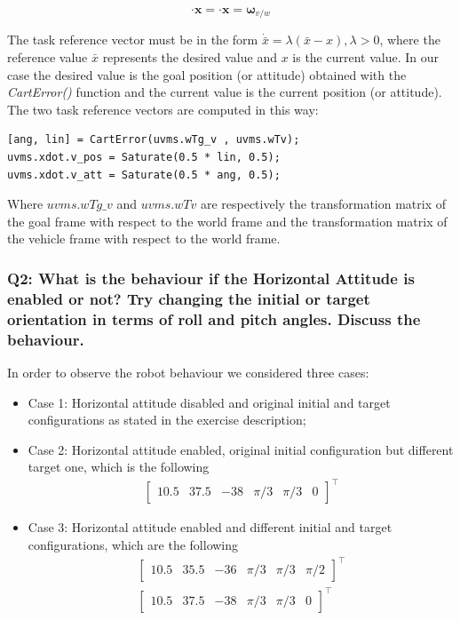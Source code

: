\documentclass{article}
\begin{document}
$$
\cdot{\bm{x}} = \cdot{\bm{x}} = \bm{\omega}_{v/w}
$$

The task reference vector must be in the form $ \dot{\bar{x}} = \lambda(\bar{x} - x), \lambda > 0 $, where the reference value $ \bar{x} $ represents the desired value and $ x $ is the current value. In our case the desired value is the goal position (or attitude) obtained with the \textit{CartError()} function and the current value is the current position (or attitude). \\
The two task reference vectors are computed in this way:
\begin{lstlisting}
[ang, lin] = CartError(uvms.wTg_v , uvms.wTv);
uvms.xdot.v_pos = Saturate(0.5 * lin, 0.5);
uvms.xdot.v_att = Saturate(0.5 * ang, 0.5);
\end{lstlisting}
Where $ uvms.wTg\_v $ and $ uvms.wTv $ are respectively the transformation matrix of the goal frame with respect to the world frame and the transformation matrix of the vehicle frame with respect to the world frame. 


\subsubsection{Q2: What is the behaviour if the Horizontal Attitude is enabled or not? Try changing the initial or target orientation in terms of roll and pitch angles. Discuss the behaviour.}
In order to observe the robot behaviour we considered three cases:
\begin{itemize}
	\item Case 1: Horizontal attitude disabled and original initial and target configurations as stated in the exercise description;
	\item Case 2: Horizontal attitude enabled, original initial configuration but different target one, which is the following 
	\begin{gather*}
		\begin{bmatrix} 10.5 & 37.5 & -38 & \pi/3 & \pi/3 & 0\end{bmatrix}^\top
	\end{gather*}
	\item Case 3: Horizontal attitude enabled and different initial and target configurations, which are the following 
	\begin{gather*}
		\begin{bmatrix} 10.5 & 35.5 & -36 & \pi/3 & \pi/3 & \pi/2\end{bmatrix}^\top \\
		\begin{bmatrix} 10.5 & 37.5 & -38 & \pi/3 & \pi/3 & 0\end{bmatrix}^\top
	\end{gather*}
\end{itemize}
\end{document}
